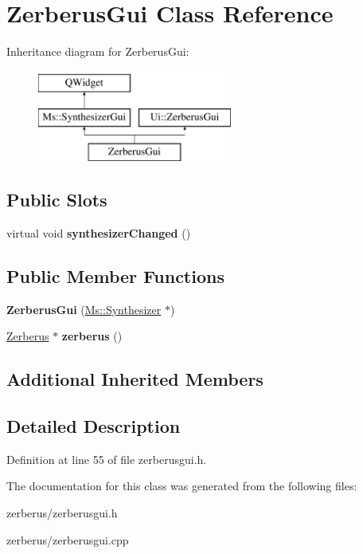 \hypertarget{class_zerberus_gui}{}\section{Zerberus\+Gui Class Reference}
\label{class_zerberus_gui}
Inheritance diagram for Zerberus\+Gui\+:\begin{figure}[H]
\begin{center}
\leavevmode
\includegraphics[height=3.000000cm]{class_zerberus_gui}
\end{center}
\end{figure}
\subsection*{Public Slots}
\begin{DoxyCompactItemize}
\item 
\mbox{\label{class_zerberus_gui_ad009d03fb65a9008aa0ed8dbcd645f4d}} 
virtual void {\bfseries synthesizer\+Changed} ()
\end{DoxyCompactItemize}
\subsection*{Public Member Functions}
\begin{DoxyCompactItemize}
\item 
\mbox{\label{class_zerberus_gui_ae6d453f9b18cf9b5c439093bc7b7dd71}} 
{\bfseries Zerberus\+Gui} (\hyperlink{class_ms_1_1_synthesizer}{Ms\+::\+Synthesizer} $\ast$)
\item 
\mbox{\label{class_zerberus_gui_ae51c5c769e4e644063ce07e1831eba4d}} 
\hyperlink{class_zerberus}{Zerberus} $\ast$ {\bfseries zerberus} ()
\end{DoxyCompactItemize}
\subsection*{Additional Inherited Members}


\subsection{Detailed Description}


Definition at line 55 of file zerberusgui.\+h.



The documentation for this class was generated from the following files\+:\begin{DoxyCompactItemize}
\item 
zerberus/zerberusgui.\+h\item 
zerberus/zerberusgui.\+cpp\end{DoxyCompactItemize}

